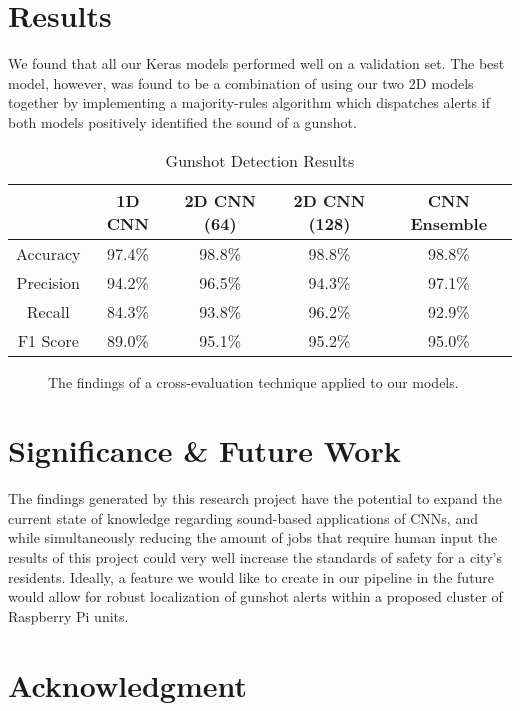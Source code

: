 \documentclass[conference]{IEEEtran}
\begin{document}
\section{Results}

We found that all our Keras models performed well on a validation set. The best model, however, was found to be a combination of using our two 2D models together by implementing a majority-rules algorithm which dispatches alerts if both models positively identified the sound of a gunshot.

\begin{table}[htbp]
\caption{Gunshot Detection Results}
\begin{center}
\begin{tabular}{|c|c|c|c|c|}
\hline
& \textbf{1D CNN} & \textbf{2D CNN (64)} & \textbf{2D CNN (128)} & \textbf{CNN Ensemble} \\
\cline{2-4}
\hline
Accuracy & 97.4\%    & 98.8\% & 98.8\% & 98.8\%  \\
\hline
Precision & 94.2\% & 96.5\% & 94.3\% & 97.1\% \\
\hline
Recall & 84.3\% & 93.8\% & 96.2\% & 92.9\% \\
\hline
F1 Score & 89.0\% & 95.1\% & 95.2\% & 95.0\% \\
\hline
\end{tabular}
\label{tab2}
\end{center}
\end{table}

\begin{figure}[htbp]
\caption{The findings of a cross-evaluation technique applied to our models.}
\label{fig2}
\end{figure}

\section{Significance \& Future Work}

The findings generated by this research project have the potential to expand the current state of knowledge regarding sound-based applications of CNNs, and while simultaneously reducing the amount of jobs that require human input the results of this project could very well increase the standards of safety for a city’s residents. Ideally, a feature we would like to create in our pipeline in the future would allow for robust localization of gunshot alerts within a proposed cluster of Raspberry Pi units.

\section*{Acknowledgment}
\end{document}
